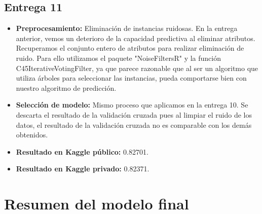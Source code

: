\subsection{Entrega 11}
\begin{itemize}
\item \textbf{Preprocesamiento:} Eliminación de instancias ruidosas. En la entrega anterior, vemos un deterioro de la capacidad predictiva al eliminar atributos. Recuperamos el conjunto entero de atributos para realizar eliminación de ruido. Para ello utilizamos el paquete "NoiseFiltersR" y la función C45IterativeVotingFilter, ya que parece razonable que al ser un algoritmo que utiliza árboles para seleccionar las instancias, pueda comportarse bien con nuestro algoritmo de predicción.
\item \textbf{Selección de modelo:} Mismo proceso que aplicamos en la entrega 10. Se descarta el resultado de la validación cruzada pues al limpiar el ruido de los datos, el resultado de la validación cruzada no es comparable con los demás obtenidos.
\item \textbf{Resultado en Kaggle público:} 0.82701.
\item \textbf{Resultado en Kaggle privado:} 0.82371.
\end{itemize}

\section{Resumen del modelo final}


